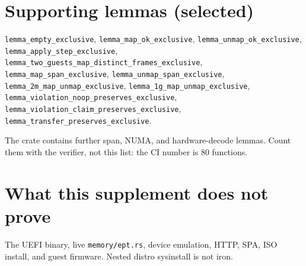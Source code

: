 \documentclass[sigplan,10pt,anonymous]{acmart}
\begin{document}
\section{Supporting lemmas (selected)}

\texttt{lemma\_empty\_exclusive},
\texttt{lemma\_map\_ok\_exclusive},
\texttt{lemma\_unmap\_ok\_exclusive},
\texttt{lemma\_apply\_step\_exclusive},
\texttt{lemma\_two\_guests\_map\_distinct\_frames\_exclusive},
\texttt{lemma\_map\_span\_exclusive},
\texttt{lemma\_unmap\_span\_exclusive},
\texttt{lemma\_2m\_map\_unmap\_exclusive},
\texttt{lemma\_1g\_map\_unmap\_exclusive},
\texttt{lemma\_violation\_noop\_preserves\_exclusive},
\texttt{lemma\_violation\_claim\_preserves\_exclusive},
\texttt{lemma\_transfer\_preserves\_exclusive}.

The crate contains further span, NUMA, and hardware-decode lemmas. Count
them with the verifier, not this list: the CI number is 80 functions.

\section{What this supplement does not prove}

The UEFI binary, live \texttt{memory/ept.rs}, device emulation, HTTP, SPA,
ISO install, and guest firmware. Nested distro sysinstall is not iron.
\end{document}
